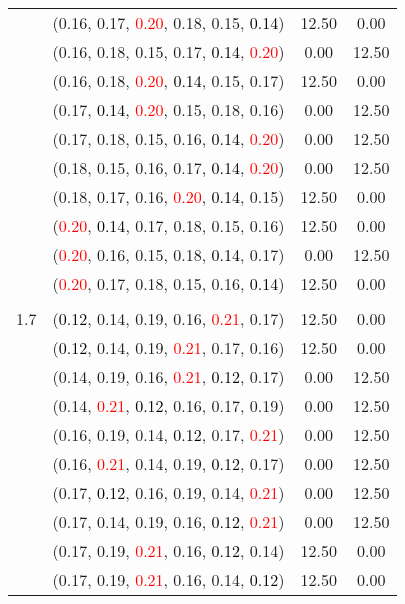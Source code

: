 \documentclass[10pt,a4paper]{report}
\begin{document}
\begin{center}
\begin{longtable}{clcc}
			&(0.16, 0.17, \textcolor{red}{0.20}, 0.18, 0.15, \textcolor{black}{0.14})&12.50&0.00\\
			&(0.16, 0.18, 0.15, 0.17, \textcolor{black}{0.14}, \textcolor{red}{0.20})&0.00&12.50\\
			&(0.16, 0.18, \textcolor{red}{0.20}, \textcolor{black}{0.14}, 0.15, 0.17)&12.50&0.00\\
			&(0.17, \textcolor{black}{0.14}, \textcolor{red}{0.20}, 0.15, 0.18, 0.16)&0.00&12.50\\
			&(0.17, 0.18, 0.15, 0.16, \textcolor{black}{0.14}, \textcolor{red}{0.20})&0.00&12.50\\
			&(0.18, 0.15, 0.16, 0.17, \textcolor{black}{0.14}, \textcolor{red}{0.20})&0.00&12.50\\
			&(0.18, 0.17, 0.16, \textcolor{red}{0.20}, \textcolor{black}{0.14}, 0.15)&12.50&0.00\\
			&(\textcolor{red}{0.20}, \textcolor{black}{0.14}, 0.17, 0.18, 0.15, 0.16)&12.50&0.00\\
			&(\textcolor{red}{0.20}, 0.16, 0.15, 0.18, \textcolor{black}{0.14}, 0.17)&0.00&12.50\\
			&(\textcolor{red}{0.20}, 0.17, 0.18, 0.15, 0.16, \textcolor{black}{0.14})&12.50&0.00\\
		&&&\\
		1.7			&(\textcolor{black}{0.12}, 0.14, 0.19, 0.16, \textcolor{red}{0.21}, 0.17)&12.50&0.00\\
			&(\textcolor{black}{0.12}, 0.14, 0.19, \textcolor{red}{0.21}, 0.17, 0.16)&12.50&0.00\\
			&(0.14, 0.19, 0.16, \textcolor{red}{0.21}, \textcolor{black}{0.12}, 0.17)&0.00&12.50\\
			&(0.14, \textcolor{red}{0.21}, \textcolor{black}{0.12}, 0.16, 0.17, 0.19)&0.00&12.50\\
			&(0.16, 0.19, 0.14, \textcolor{black}{0.12}, 0.17, \textcolor{red}{0.21})&0.00&12.50\\
			&(0.16, \textcolor{red}{0.21}, 0.14, 0.19, \textcolor{black}{0.12}, 0.17)&0.00&12.50\\
			&(0.17, \textcolor{black}{0.12}, 0.16, 0.19, 0.14, \textcolor{red}{0.21})&0.00&12.50\\
			&(0.17, 0.14, 0.19, 0.16, \textcolor{black}{0.12}, \textcolor{red}{0.21})&0.00&12.50\\
			&(0.17, 0.19, \textcolor{red}{0.21}, 0.16, \textcolor{black}{0.12}, 0.14)&12.50&0.00\\
			&(0.17, 0.19, \textcolor{red}{0.21}, 0.16, 0.14, \textcolor{black}{0.12})&12.50&0.00\\

\end{longtable}
\end{center}
\end{document}
